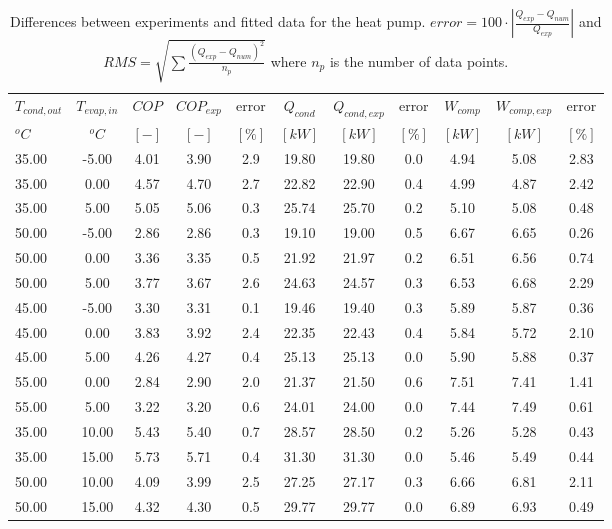 \documentclass[english]{SPFShortReport}
\begin{document}
\begin{table}[!ht]
\begin{small}
\caption{Differences between experiments and fitted data for the heat pump.          $error=100 \cdot |\frac{Q_{exp}-Q_{num}}{Q_{exp}}|$ and $RMS = \sqrt { \sum{\frac{(Q_{exp}-Q_{num})^2}{n_p}} }$ where $n_p$ is the number of data points.}
\begin{center}
\resizebox{12cm}{!} 
{
\begin{tabular}{l | c c c c c c c c c c } 
\hline
\hline
$T_{cond,out}$ &$T_{evap,in}$ &$COP$ &$COP_{exp}$ &error &$Q_{cond}$ &$Q_{cond,exp}$ &error &$W_{comp}$ &$W_{comp,exp}$ &error \\ 
$^oC$ &$^oC$ &$[-]$ &$[-]$ &$[\%]$ &$[kW]$ &$[kW]$ &$[\%]$ &$[kW]$ &$[kW]$ &$[\%]$\\ 
\hline
35.00  & -5.00 & 4.01 & 3.90 & 2.9 & 19.80 & 19.80 & 0.0 & 4.94 & 5.08 & 2.83\\ 
35.00  & 0.00 & 4.57 & 4.70 & 2.7 & 22.82 & 22.90 & 0.4 & 4.99 & 4.87 & 2.42\\ 
35.00  & 5.00 & 5.05 & 5.06 & 0.3 & 25.74 & 25.70 & 0.2 & 5.10 & 5.08 & 0.48\\ 
50.00  & -5.00 & 2.86 & 2.86 & 0.3 & 19.10 & 19.00 & 0.5 & 6.67 & 6.65 & 0.26\\ 
50.00  & 0.00 & 3.36 & 3.35 & 0.5 & 21.92 & 21.97 & 0.2 & 6.51 & 6.56 & 0.74\\ 
50.00  & 5.00 & 3.77 & 3.67 & 2.6 & 24.63 & 24.57 & 0.3 & 6.53 & 6.68 & 2.29\\ 
45.00  & -5.00 & 3.30 & 3.31 & 0.1 & 19.46 & 19.40 & 0.3 & 5.89 & 5.87 & 0.36\\ 
45.00  & 0.00 & 3.83 & 3.92 & 2.4 & 22.35 & 22.43 & 0.4 & 5.84 & 5.72 & 2.10\\ 
45.00  & 5.00 & 4.26 & 4.27 & 0.4 & 25.13 & 25.13 & 0.0 & 5.90 & 5.88 & 0.37\\ 
55.00  & 0.00 & 2.84 & 2.90 & 2.0 & 21.37 & 21.50 & 0.6 & 7.51 & 7.41 & 1.41\\ 
55.00  & 5.00 & 3.22 & 3.20 & 0.6 & 24.01 & 24.00 & 0.0 & 7.44 & 7.49 & 0.61\\ 
35.00  & 10.00 & 5.43 & 5.40 & 0.7 & 28.57 & 28.50 & 0.2 & 5.26 & 5.28 & 0.43\\ 
35.00  & 15.00 & 5.73 & 5.71 & 0.4 & 31.30 & 31.30 & 0.0 & 5.46 & 5.49 & 0.44\\ 
50.00  & 10.00 & 4.09 & 3.99 & 2.5 & 27.25 & 27.17 & 0.3 & 6.66 & 6.81 & 2.11\\ 
50.00  & 15.00 & 4.32 & 4.30 & 0.5 & 29.77 & 29.77 & 0.0 & 6.89 & 6.93 & 0.49\\ 

\end{tabular}}
\end{center}
\end{small}
\end{table}
\end{document}
